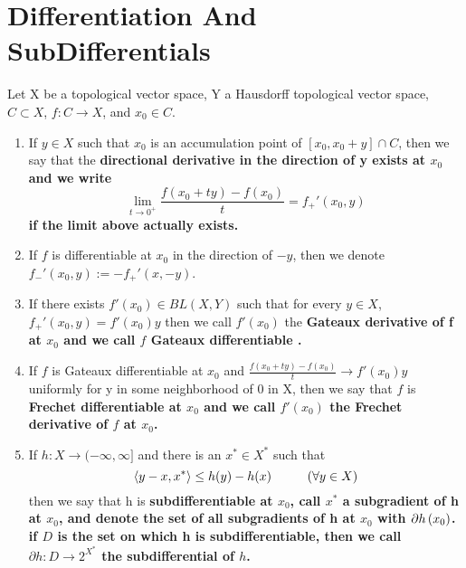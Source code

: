 
\section{Differentiation And SubDifferentials}
\begin{df}
    \label{df:typesofdifferentiability}
    Let X be a topological vector space, Y a Hausdorff topological vector space, $C \subset X$, $f:C \to X$, and $x_0 \in C$. 
    \begin{enumerate}
        \item If $y \in X$ such that $x_0$ is an accumulation point of $[x_0,x_0+y] \cap C$, then we say that the \bf directional derivative in the direction of y \rm exists at $x_0$ and we write 
        \begin{equation}
            \lim\limits_{t \to 0^+} \frac{f(x_0+ty)-f(x_0)}{t} = f_+'(x_0,y)
        \end{equation}
        if the limit above actually exists.
        \item If $f$ is differentiable at $x_0$ in the direction of $-y$, then we denote $f_-'(x_0,y):=-f_+'(x,-y)$. 
        \item If there exists $f'(x_0) \in BL(X,Y)$ such that for every $y \in X$, $f_+'(x_0,y)=f'(x_0)y$ then we call $f'(x_0)$ the \bf Gateaux derivative \rm of f at $x_0$ and we call $f$ \bf Gateaux differentiable \rm. 
        \item If $f$ is Gateaux differentiable at $x_0$ and $\frac{f(x_0+ty)-f(x_0)}{t} \to f'(x_0)y$ uniformly for y in some neighborhood of 0 in X, then we say that $f$ is \bf Frechet differentiable \rm at $x_0$ and we call $f'(x_0)$ the \bf Frechet derivative \rm of $f$ at $x_0$.  
        \item If $h:X \to (-\infty,\infty]$ and there is an $x^* \in X^*$ such that 
        \begin{equation}
            \label{eq:subgradientdf}
            \ip{y-x,x^*} \leq h(y)-h(x) \tab[1cm] (\forall y \in X)
        \end{equation} 
        then we say that h is \bf subdifferentiable \rm at $x_0$, call $x^*$ a \bf subgradient \rm of h at $x_0$, and denote the set of all subgradients of h at $x_0$ with $\partial h \left( x_0\right)$. if $D$ is the set on which h is subdifferentiable, then we call $\partial h: D \to 2^{X^*}$ the \bf subdifferential \rm of $h$. 
    \end{enumerate}
\end{df} 





